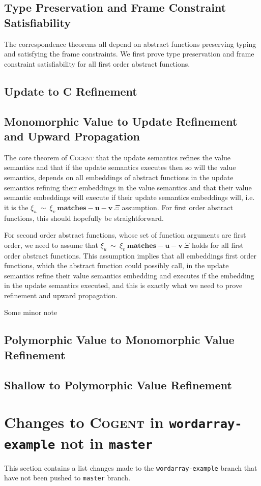 \documentclass{article}
\newcommand{\cogent}{\textsc{Cogent}\xspace}
\newcommand{\Cogent}{\textsc{Cogent}\xspace}
\begin{document}
\subsection{Type Preservation and Frame Constraint Satisfiability}
The correspondence theorems all depend on abstract functions preserving
typing and satisfying the frame constraints.
We first prove type preservation and frame constraint satisfiability for
all first order abstract functions.

\subsection{Update to C Refinement}
\subsection{Monomorphic Value to Update Refinement and Upward Propagation}
The core theorem of \cogent that the update semantics refines the value
semantics and that if the update semantics executes then so will the value
semantics,
depends on all embeddings of abstract functions in the update semantics
refining their embeddings in the value semantics and that their value
semantic embeddings will execute if their update semantics embeddings will,
i.e. it is the $\xi_u~\sim~\xi_v~\mathbf{matches-u-v}~\Xi$ assumption.
For first order abstract functions, this should hopefully be straightforward.

For second order abstract functions,
whose set of function arguments are first order, we need to assume that
$\xi_u~\sim~\xi_v~\mathbf{matches-u-v}~\Xi$ holds for all first order
abstract functions.
This assumption implies that all embeddings first order
functions, which the abstract function could possibly call, in the update
semantics refine their value semantics embedding and executes if the
embedding in the update semantics executed,
and this is exactly what we need to prove refinement and upward
propagation.

Some minor note

\subsection{Polymorphic Value to Monomorphic Value Refinement}
\subsection{Shallow to Polymorphic Value Refinement}

\section{Changes to \Cogent in \texttt{wordarray-example} not in \texttt{master}}
This section contains a list changes made to the \texttt{wordarray-example}
branch that have not been pushed to \texttt{master} branch.
\end{document}
